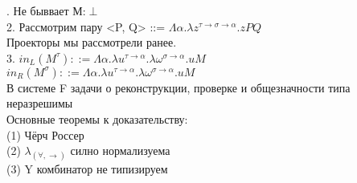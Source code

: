 \documentclass[10pt,a4paper]{article}
\begin{document}
	. Не быввает М:$\perp$\\
	2. Рассмотрим пару <P, Q> ::= $\Lambda\alpha.\lambda z^{\tau\rightarrow\sigma\rightarrow\alpha}.z P Q$ \\
	Проекторы мы рассмотрели ранее. \\
	3. $in_L(M^{\tau}) ::= \Lambda\alpha.\lambda u^{\tau\rightarrow\alpha}.\lambda\omega^{\sigma\rightarrow\alpha}.u M$\\
	$ in_R(M^{\sigma}) ::= \Lambda\alpha.\lambda u^{\tau\rightarrow\alpha}.\lambda\omega^{\sigma\rightarrow\alpha}.u M$\\
	
	В системе F задачи о реконструкции, проверке и общезначности типа неразрешимы\\
	
	Основные теоремы к доказательству: \\
	(1) Чёрч Россер\\
	(2) $\lambda_{(\forall, \rightarrow)}$ силно нормализуема \\
	(3) Y комбинатор не типизируем
   
\end{document}

